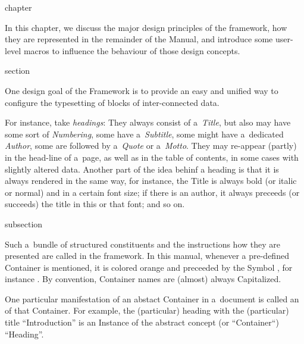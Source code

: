 \begin{Heading}{chapter}
\end{Heading}

In this chapter, we discuss the major design principles of the
{\CoCoTeX} framework, how they are represented in the remainder of the
Manual, and introduce some user-level macros to influence the
behaviour of those design concepts.


\begin{Heading}{section}
\end{Heading}

One design goal of the {\CoCoTeX} Framework is to provide an easy and
unified way to configure the typesetting of blocks of inter-connected
data.

For instance, take \textit{headings}: They always consist of
a~\textit{Title}, but also may have some sort of \textit{Numbering},
some have a~\textit{Subtitle}, some might have a~dedicated
\textit{Author}, some are followed by a~\textit{Quote} or
a~\textit{Motto}. They may re-appear (partly) in the head-line of
a~page, as well as in the table of contents, in some cases with
slightly altered data. Another part of the idea behinf a heading is
that it is always rendered in the same way, for instance, the Title is
always bold (or italic or normal) and in a certain font size; if there
is an author, it always preceeds (or succeeds) the title in this or
that font; and so on.


\begin{Heading}{subsection}
\end{Heading}

Such a~bundle of structured constituents and the instructions how they
are presented are called  in the
{\CoCoTeX} framework. In this manual, whenever a pre-defined Container
is mentioned, it is colored orange and preceeded by the Symbol
{\ContainerSymbol}, for instance . By
convention, Container names are (almost) always Capitalized.

One particular manifestation of an abstact Container in a~document is
called an  of that Container. For example, the
(particular) heading with the (particular) title “Introduction” is an
Instance of the abstract concept (or “Container“) “Heading”.

